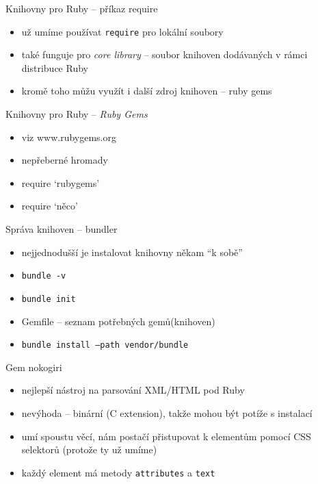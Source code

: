 \documentclass{beamer}
\begin{document}
\begin{frame}{Knihovny pro Ruby -- příkaz require}
  \begin{itemize}
    \item už umíme používat \texttt{require} pro lokální soubory
    \item také funguje pro \emph{core library} -- soubor knihoven dodávaných v rámci distribuce Ruby
    \item kromě toho můžu využít i další zdroj knihoven -- ruby gems
  \end{itemize}
\end{frame}

\begin{frame}{Knihovny pro Ruby -- \emph{Ruby Gems}}
  \begin{itemize}
    \item viz www.rubygems.org
    \item nepřeberné hromady
    \item require `rubygems'
    \item require `něco'
  \end{itemize}
\end{frame}

\begin{frame}{Správa knihoven -- bundler}
  \begin{itemize}
    \item  nejjednodušší je instalovat knihovny někam ``k sobě''
    \item  \texttt{bundle -v}
    \item  \texttt{bundle init}
    \item  Gemfile -- seznam potřebných gemů(knihoven)
    \item  \texttt{bundle install --path vendor/bundle}
  \end{itemize}
\end{frame}

\begin{frame}{Gem nokogiri}
  \begin{itemize}
    \item nejlepší nástroj na parsování XML/HTML pod Ruby
    \item nevýhoda -- binární (C extension), takže mohou být potíže s instalací
    \item umí spoustu věcí, nám postačí přistupovat k elementům pomocí CSS selektorů (protože ty už umíme)
    \item každý element má metody \texttt{attributes} a \texttt{text}
  \end{itemize}
\end{frame}
\end{document}
